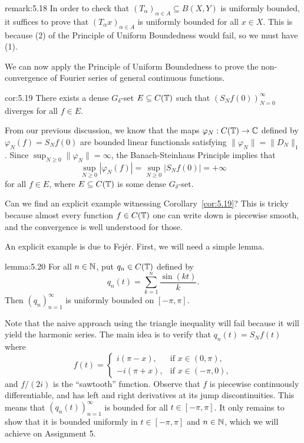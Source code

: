 \begin{remark}{remark:5.18}
    In order to check that $(T_\alpha)_{\alpha \in A} \subseteq 
    B(X, Y)$ is uniformly bounded, it suffices to prove that 
    $(T_\alpha x)_{\alpha \in A}$ is uniformly bounded for all $x \in X$. 
    This is because (2) of the Principle of Uniform Boundedness would fail, 
    so we must have (1). 
\end{remark}

We can now apply the Principle of Uniform Boundedness to prove the 
non-convergence of Fourier series of general continuous functions. 

\begin{cor}{cor:5.19}
    There exists a dense $G_\delta$-set $E \subseteq C(\mathbb{T})$ such that 
    $(S_N f(0))_{N=0}^\infty$ diverges for all $f \in E$. 
\end{cor}
\begin{pf}
    From our previous discussion, we know that the maps 
    $\varphi_N : C(\mathbb{T}) \to \mathbb{C}$ defined by 
    $\varphi_N(f) = S_N f(0)$ are bounded linear functionals satisfying 
    $\|\varphi_N\| = \|D_N\|_1$. Since $\sup_{N\geq 0} \|\varphi_N\| = \infty$, the 
    Banach-Steinhaus Principle implies that 
    \[ \sup_{N\geq 0} |\varphi_N(f)| = \sup_{N\geq 0} |S_N f(0)| = +\infty \] 
    for all $f \in E$, where $E \subseteq C(\mathbb{T})$ is some dense 
    $G_\delta$-set. 
\end{pf}

Can we find an explicit example witnessing Corollary~\ref{cor:5.19}? This 
is tricky because almost every function $f \in C(\mathbb{T})$ one can write down 
is piecewise smooth, and the convergence is well understood for those. 

An explicit example is due to Fej\'er. First, we will need a simple lemma. 

\begin{lemma}{lemma:5.20}
    For all $n \in \mathbb{N}$, put $q_n \in C(\mathbb{T})$ defined by 
    \[ q_n(t) = \sum_{k=1}^n \frac{\sin(kt)}{k}. \] 
    Then $(q_n)_{n=1}^\infty$ is uniformly bounded on $[-\pi, \pi]$. 
\end{lemma}
\begin{pf}
    Note that the naive approach using 
    the triangle inequality will fail because it will yield the harmonic 
    series. The main idea is to verify that $q_n(t) = S_N f(t)$ where 
    \[ f(t) = \begin{cases}
        i(\pi - x), & \text{if } x \in (0, \pi), \\ 
        -i(\pi + x), & \text{if } x \in (-\pi, 0),
    \end{cases} \] 
    and $f/(2i)$ is the ``sawtooth'' function. Observe that $f$ is 
    piecewise continuously differentiable, and has left and right 
    derivatives at its jump discontinuities. This means that 
    $(q_n(t))_{n=1}^\infty$ is bounded for all $t \in [-\pi, \pi]$. 
    It only remains to show that it is bounded uniformly in $t \in [-\pi, \pi]$ 
    and $n \in \mathbb{N}$, which we will achieve on Assignment 5. 
\end{pf}

